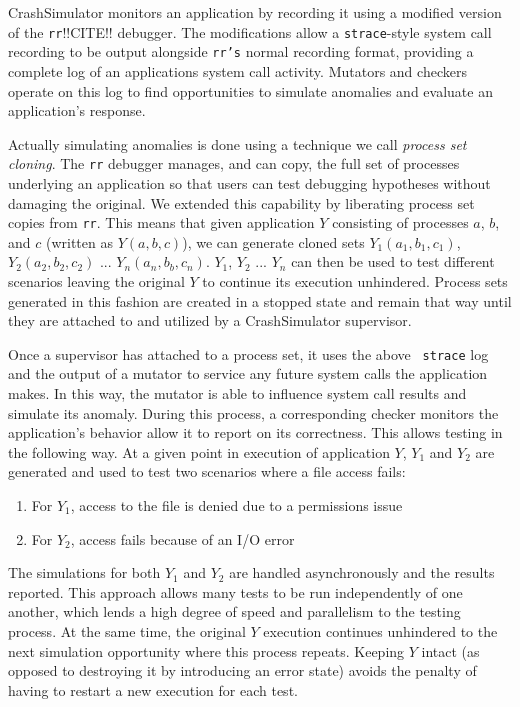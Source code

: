 CrashSimulator monitors an application by
recording it
using a modified version of the {\tt rr}!!CITE!!
debugger.
The modifications allow
a {\tt strace}-style
system call recording to be output alongside {\tt rr's} normal recording
format, providing
a complete log of an applications system call activity. Mutators and
checkers operate on this log to find opportunities to simulate
anomalies and evaluate an application's response.

Actually simulating anomalies
is done using
a technique
we call {\it process set cloning}.
The {\tt rr} debugger manages,
and can copy,
the full set of processes underlying an application
so that users can test debugging
hypotheses without damaging the original.
We extended this capability
by liberating process set copies from {\tt rr}.
This means that given application $Y$
consisting of processes $a$, $b$, and $c$
(written as $Y(a, b, c)$),
we can generate cloned sets $Y_1(a_1, b_1, c_1)$,
$Y_2(a_2, b_2, c_2)$ ... $Y_n(a_n, b_b, c_n)$.
$Y_1$, $Y_2$ ... $Y_n$ can then be used to test different scenarios leaving
the original $Y$ to continue its execution unhindered.
Process sets generated in this fashion are created in a stopped state and
remain that way until they are attached to and utilized by a CrashSimulator
supervisor.

Once a supervisor has attached to a process set, it uses the above {\tt
strace} log and the output of a mutator to service any future
system calls the application makes.  In this way, the mutator is able to
influence system call results and simulate its anomaly.
During this process,
a corresponding checker
monitors the application's behavior allow it to report on its correctness.
This allows testing in the following way.
At a given point in execution of application $Y$,
$Y_1$ and $Y_2$ are generated and
used to test two scenarios where a file access fails:
\begin{enumerate}
    \item{For $Y_1$, access to the file is denied due to a permissions issue}
    \item{For $Y_2$, access fails because of an I/O error}
\end{enumerate}
The simulations for both $Y_1$ and $Y_2$ are handled asynchronously and
the results reported.
This approach allows many tests to be run independently of one another,
which lends a
high degree of speed and
parallelism to the testing process.
At the same time, the original $Y$ execution continues unhindered to the
next simulation opportunity where this process repeats.
Keeping $Y$ intact
(as opposed to destroying it by introducing an error state)
avoids the penalty
of having to restart a new execution for each test.

